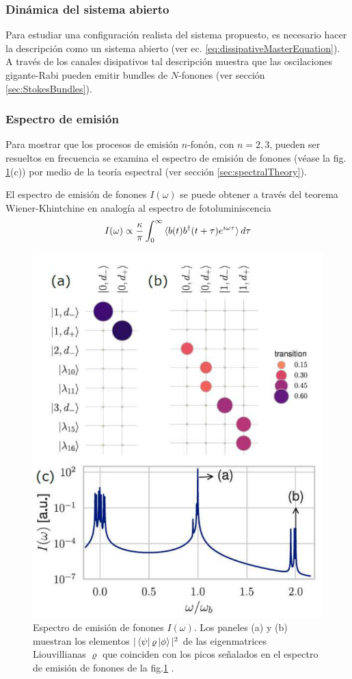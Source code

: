 \documentclass[../main.tex]{subfiles}
\begin{document}
\subsubsection{Dinámica del sistema abierto}
Para estudiar una configuración realista del sistema propuesto, es necesario hacer la descripción como un sistema abierto (ver ec. \ref{eq:dissipativeMasterEquation}). A través de los canales disipativos tal descripción muestra que las oscilaciones gigante-Rabi pueden emitir bundles de $N$-fonones (ver sección \ref{sec:StokesBundles}). 

\subsubsection{Espectro de emisión}
Para mostrar que los procesos de emisión $n$-fonón, con $n=2,3$, pueden ser resueltos en frecuencia se examina el espectro de emisión de fonones (véase la fig. \ref{fig:emissionspectrumgiant-rabi}(c)) por medio de la teoría espectral (ver sección \ref{sec:spectralTheory}).

El espectro de emisión de fonones $I(\omega)$ se puede obtener a través del teorema Wiener-Khintchine en analogía al espectro de fotoluminiscencia \parencite{Perea2004}
\begin{equation}
	I(\omega) \propto \frac{\kappa}{\pi} \int_0^\infty \braket{b(t) b^\dagger(t+\tau) e^{i\omega\tau}} d\tau
\end{equation}

\begin{figure}[th]
	\centering
	\includegraphics[width=0.55\linewidth]{img/emissionSpectrum_Giant-Rabi}
	\caption{Espectro de emisión de fonones $I(\omega)$. Los paneles (a) y (b) muestran los elementos $|\bra{\psi}\varrho\ket{\phi}|^2$ de las eigenmatrices Liouvillianas $\varrho$ que coinciden con los picos señalados en el espectro de emisión de fonones de la fig.\ref{fig:emissionspectrumgiant-rabi} \parencite{Vargas2022}.}
	\label{fig:emissionspectrumgiant-rabi}
\end{figure}
\end{document}
